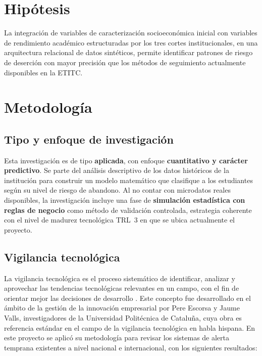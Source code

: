 \documentclass[12pt,letterpaper]{article}
\begin{document}
\newpage

\section{Hipótesis}

La integración de variables de caracterización socioeconómica inicial con variables de rendimiento académico estructuradas por los tres cortes institucionales, en una arquitectura relacional de datos sintéticos, permite identificar patrones de riesgo de deserción con mayor precisión que los métodos de seguimiento actualmente disponibles en la ETITC.

\newpage

\section{Metodología}

\subsection{Tipo y enfoque de investigación}

Esta investigación es de tipo \textbf{aplicada}, con enfoque \textbf{cuantitativo y carácter predictivo}. Se parte del análisis descriptivo de los datos históricos de la institución para construir un modelo matemático que clasifique a los estudiantes según su nivel de riesgo de abandono. Al no contar con microdatos reales disponibles, la investigación incluye una fase de \textbf{simulación estadística con reglas de negocio} como método de validación controlada, estrategia coherente con el nivel de madurez tecnológica TRL~3 en que se ubica actualmente el proyecto.

\subsection{Vigilancia tecnológica}

La vigilancia tecnológica es el proceso sistemático de identificar, analizar y aprovechar las tendencias tecnológicas relevantes en un campo, con el fin de orientar mejor las decisiones de desarrollo \parencite{escorsa2003}. Este concepto fue desarrollado en el ámbito de la gestión de la innovación empresarial por Pere Escorsa y Jaume Valls, investigadores de la Universidad Politécnica de Cataluña, cuya obra es referencia estándar en el campo de la vigilancia tecnológica en habla hispana. En este proyecto se aplicó su metodología para revisar los sistemas de alerta temprana existentes a nivel nacional e internacional, con los siguientes resultados:
\end{document}
